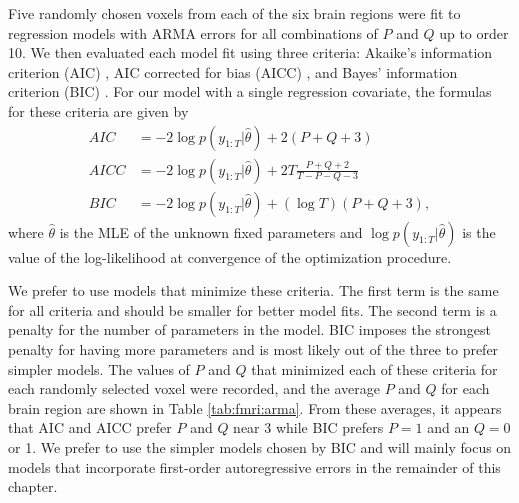 Five randomly chosen voxels from each of the six brain regions were fit to regression models with ARMA errors for all combinations of $P$ and $Q$ up to order 10. We then evaluated each model fit using three criteria: Akaike's information criterion (AIC) \citep{sak:ish:kit:aic:1986}, AIC corrected for bias (AICC) \citep{sug:aicc:1978,hurv:tsai:aicc:1989}, and Bayes' information criterion (BIC) \citep{schwarz:bic:1978}. For our model with a single regression covariate, the formulas for these criteria are given by
\begin{align}
AIC &= -2\log p(y_{1:T}|\hat{\theta}) + 2(P+Q+3) \label{eqn:aic} \\
AICC &= -2\log p(y_{1:T}|\hat{\theta}) + 2T\frac{P+Q+2}{T-P-Q-3} \label{eqn:aicc} \\
BIC &= -2\log p(y_{1:T}|\hat{\theta}) + (\log T)(P+Q+3), \label{eqn:bic}
\end{align}
where $\hat{\theta}$ is the MLE of the unknown fixed parameters and $\log p(y_{1:T}|\hat{\theta})$ is the value of the log-likelihood at convergence of the optimization procedure.

We prefer to use models that minimize these criteria. The first term is the same for all criteria and should be smaller for better model fits. The second term is a penalty for the number of parameters in the model. BIC imposes the strongest penalty for having more parameters and is most likely out of the three to prefer simpler models. The values of $P$ and $Q$ that minimized each of these criteria for each randomly selected voxel were recorded, and the average $P$ and $Q$ for each brain region are shown in Table \ref{tab:fmri:arma}. From these averages, it appears that AIC and AICC prefer $P$ and $Q$ near 3 while BIC prefers $P = 1$ and an $Q = 0$ or 1. We prefer to use the simpler models chosen by BIC and will mainly focus on models that incorporate first-order autoregressive errors in the remainder of this chapter.

